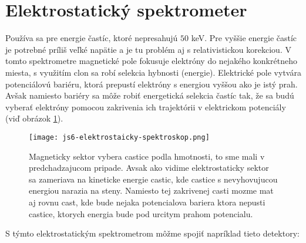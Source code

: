 \documentclass[../../main.tex]{subfiles}
\begin{document}
\section{Elektrostatický spektrometer}
Používa sa pre energie častíc, ktoré nepresahujú $50$ keV. Pre vyššie energie častíc je potrebné príliš veľké napätie a je tu problém aj s relativistickou korekciou. V tomto spektrometre magnetické pole fokusuje elektróny do nejakého konkrétneho miesta, s využitím clon sa robí selekcia hybnosti (energie). Elektrické pole vytvára potenciálovú bariéru, ktorá prepustí elektróny s energiou vyššou ako je istý prah. Avšak namiesto bariéry sa môže robiť energetická selekcia častíc tak, že sa budú vyberať elektróny pomocou zakrivenia ich trajektórii v elektrickom potenciály  (viď obrázok \ref{js6:fig:elektrostaticky_spektrometer}).
\begin{figure}[!h]
\centering
\texttt{[image: js6-elektrostaicky-spektroskop.png]}
\caption{Magneticky sektor vybera castice podla hmotnosti, to sme mali v predchadzajucom pripade. Avsak ako vidime elektrostaticky sektor sa zameriava na kineticke energie castic, kde castice s nevyhovujucou energiou narazia na steny. Namiesto tej zakrivenej casti mozme mat aj rovnu cast, kde bude nejaka potencialova bariera ktora nepusti castice, ktorych energia bude pod urcitym prahom potencialu.}
\label{js6:fig:elektrostaticky_spektrometer}
\end{figure}
S týmto elektrostatickým spektrometrom môžme spojiť napríklad tieto detektory:
\end{document}
